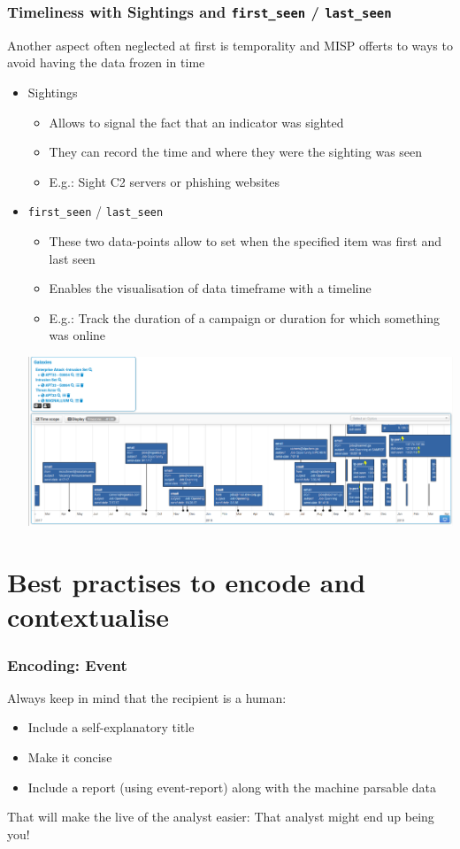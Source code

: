 \begin{frame}
    \frametitle{Timeliness with Sightings and \texttt{first\_seen} / \texttt{last\_seen}}
    Another aspect often neglected at first is temporality and MISP offerts to ways to avoid having the data frozen in time
    \begin{itemize}
        \item Sightings
        \begin{itemize}
            \item Allows to signal the fact that an indicator was sighted
            \item They can record the time and where they were the sighting was seen
            \item E.g.: Sight C2 servers or phishing websites
        \end{itemize}
        \item \texttt{first\_seen} / \texttt{last\_seen}
        \begin{itemize}
            \item These two data-points allow to set when the specified item was first and last seen
            \item Enables the visualisation of data timeframe with a timeline
            \item E.g.: Track the duration of a campaign or duration for which something was online
        \end{itemize}
        \includegraphics[scale=1.0]{pictures/timeline.png}
    \end{itemize}
\end{frame}

\section{Best practises to encode and contextualise}
\begin{frame}
    \frametitle{Encoding: Event}
    Always keep in mind that the recipient is a human:
    \begin{itemize}
        \item Include a self-explanatory title
        \item Make it concise
        \item Include a report (using event-report) along with the machine parsable data
    \end{itemize}
    That will make the live of the analyst easier: That analyst might end up being you!
\end{frame}

